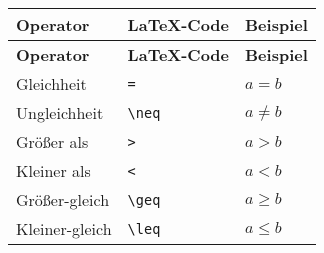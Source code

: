 \renewcommand{\arraystretch}{1.5}
\begin{longtable}{l l l}
    \\
    \toprule
    \textbf{Operator}         & \textbf{LaTeX-Code}                                                                     & \textbf{Beispiel}                    \\
    \midrule
    \endfirsthead
    \toprule
    \textbf{Operator}         & \textbf{LaTeX-Code}                                                                     & \textbf{Beispiel}                    \\
    \midrule
    \endhead

    \bottomrule
    \endlastfoot

    Gleichheit                & \texttt{=}                                                                              & $ a = b $                            \\
    Ungleichheit              & \texttt{\textbackslash neq}                                                             & $ a \neq b $                         \\
    Größer als                & \texttt{>}                                                                              & $ a > b $                            \\
    Kleiner als               & \texttt{<}                                                                              & $ a < b $                            \\
    Größer-gleich             & \texttt{\textbackslash geq}                                                             & $ a \geq b $                         \\
    Kleiner-gleich            & \texttt{\textbackslash leq}                                                             & $ a \leq b $                         \\


\end{longtable}
